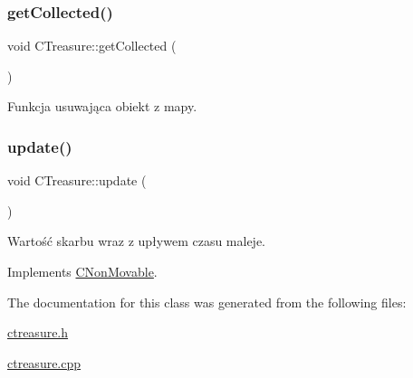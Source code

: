 \subsubsection{\texorpdfstring{get\+Collected()}{getCollected()}}
{\footnotesize\ttfamily void C\+Treasure\+::get\+Collected (\begin{DoxyParamCaption}{ }\end{DoxyParamCaption})}



Funkcja usuwająca obiekt z mapy. 

\mbox{\label{class_c_treasure_a5030f2a7279aa608c40741f9e7040a90}} 
\subsubsection{\texorpdfstring{update()}{update()}}
{\footnotesize\ttfamily void C\+Treasure\+::update (\begin{DoxyParamCaption}{ }\end{DoxyParamCaption})\hspace{0.3cm}{\ttfamily [virtual]}}



Wartość skarbu wraz z upływem czasu maleje. 



Implements \mbox{\hyperlink{class_c_non_movable_ace03bea0246940c6c5c0b26ffa1ef165}{C\+Non\+Movable}}.



The documentation for this class was generated from the following files\+:\begin{DoxyCompactItemize}
\item 
\mbox{\hyperlink{ctreasure_8h}{ctreasure.\+h}}\item 
\mbox{\hyperlink{ctreasure_8cpp}{ctreasure.\+cpp}}\end{DoxyCompactItemize}
